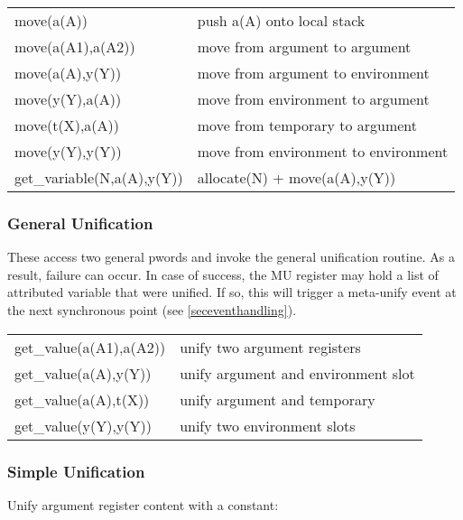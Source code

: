 \begin{tabular}{|p{}|p{}|}
\hline
move(a(A))              & push a(A) onto local stack \\
move(a(A1),a(A2))       & move from argument to argument  \\
move(a(A),y(Y))         & move from argument to environment       \\
move(y(Y),a(A))         & move from environment to argument      \\
move(t(X),a(A))         & move from temporary to argument      \\
move(y(Y),y(Y))         & move from environment to environment      \\
\hline
get_variable(N,a(A),y(Y))& allocate(N) + move(a(A),y(Y))        \\
\hline
\end{tabular}

\subsubsection{General Unification}
These access two general pwords and invoke the general unification  routine.
As a result, failure can occur.  In case of success, the MU  register may
hold a list of attributed variable that were unified. If so, this will
trigger a meta-unify  event at the next synchronous point
(see \ref{seceventhandling}).

\begin{tabular}{|p{}|p{}|}
\hline
get_value(a(A1),a(A2))          & unify two argument registers             \\
get_value(a(A),y(Y))            & unify argument and environment slot                \\
get_value(a(A),t(X))            & unify argument and temporary                \\
get_value(y(Y),y(Y))            & unify two environment slots               \\
\hline
\end{tabular}

\subsubsection{Simple Unification}
Unify argument register content with a constant:


